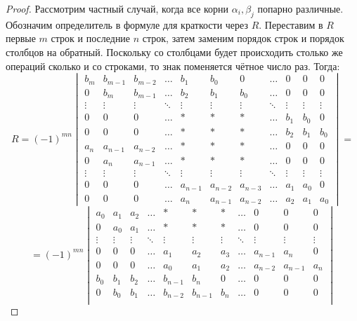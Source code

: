 \documentclass[12pt]{article}
\theoremstyle{definition}
\begin{document}
\begin{proof}
	Рассмотрим частный случай, когда все корни $\alpha_i, \beta_j$ попарно различные. Обозначим определитель в формуле для краткости через $R$. Переставим в $R$ первые $m$ строк и последние $n$ строк, затем заменим порядок строк и порядок столбцов на обратный. Поскольку со столбцами будет происходить столько же операций сколько и со строками, то знак поменяется чётное число раз. Тогда:
	$$
		R = (-1)^{mn}
		\begin{vmatrix}
			b_m & b_{m-1} & b_{m-2} & \dotsc & b_1 & b_0 & 0 & \dotsc  & 0 & 0& 0 \\
			0   & b_m & b_{m-1} & \dotsc & b_2 & b_1 & b_0 & \dotsc  & 0 & 0& 0 \\
			\vdots & \vdots  & \vdots & \ddots& \vdots & \vdots &\vdots & \ddots & \vdots & \vdots & \vdots \\
			0 & 0 & 0 & \dotsc & * & * & * & \dotsc & b_1 & b_0 & 0\\
			0 & 0 & 0 & \dotsc & * & * & * & \dotsc & b_2 & b_1 & b_0\\
			a_{n} & a_{n-1} & a_{n-2}  & \dotsc   & * & * & * &  \dotsc & 0 & 0 & 0\\
			0 & a_{n} & a_{n-1}  & \dotsc & * & * & * & \dotsc & 0 & 0& 0\\
			\vdots & \vdots  & \vdots & \ddots& \vdots & \vdots &\vdots & \ddots & \vdots & \vdots & \vdots \\
			0 & 0 & 0 & \dotsc & a_{n-1} &  a_{n-2} & a_{n-3}& \dotsc & a_1 & a_0& 0\\
			0 & 0 & 0 & \dotsc & a_n & a_{n-1} & a_{n-2} & \dotsc & a_2 & a_1 & a_0
		\end{vmatrix} =
	$$
	$$
		= (-1)^{mn}
		\begin{vmatrix}
			a_{0} & a_{1} & a_{2}  & \dotsc   & * & * & * &  \dotsc & 0 & 0 & 0\\
			0 & a_{0} & a_{1}  & \dotsc & * & * & * & \dotsc & 0 & 0& 0\\
			\vdots & \vdots  & \vdots & \ddots& \vdots & \vdots &\vdots & \ddots & \vdots & \vdots & \vdots \\
			0 & 0 & 0 & \dotsc & a_{1} &  a_{2} & a_{3}& \dotsc & a_{n-1} & a_n& 0\\
			0 & 0 & 0 & \dotsc & a_0 & a_1 & a_{2} & \dotsc & a_{n-2} & a_{n-1} & a_n\\
			b_0 & b_{1} & b_{2} & \dotsc & b_{n-1} & b_n & 0 & \dotsc  & 0 & 0& 0 \\
			0   & b_0 & b_{1} & \dotsc & b_{n-2} & b_{n-1} & b_n & \dotsc  & 0 & 0& 0 \\

\end{vmatrix}$$
\end{proof}
\end{document}
